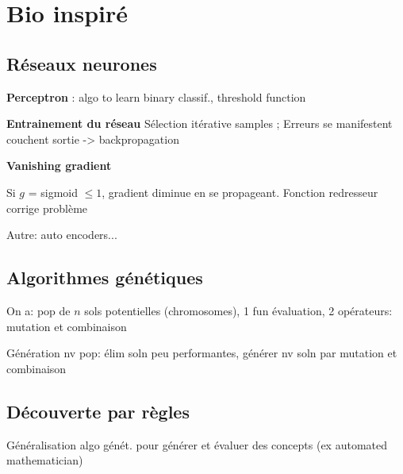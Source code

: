 \section*{Bio inspiré}

\subsection*{Réseaux neurones}

\textbf{Perceptron} : algo to learn binary classif., threshold function

\textbf{Entrainement du réseau}
Sélection itérative samples ; Erreurs se manifestent couchent sortie -> backpropagation

\textbf{Vanishing gradient}

Si $g$ = sigmoid $\leq 1$, gradient diminue en se propageant. Fonction redresseur corrige problème

Autre: auto encoders...


\subsection*{Algorithmes génétiques}

On a: pop de $n$ sols potentielles (chromosomes), 1 fun évaluation, 2 opérateurs: mutation et combinaison

Génération nv pop: élim soln peu performantes, générer nv soln par mutation et combinaison

\subsection*{Découverte par règles}

Généralisation algo génét. pour générer et évaluer des concepts (ex automated mathematician)

